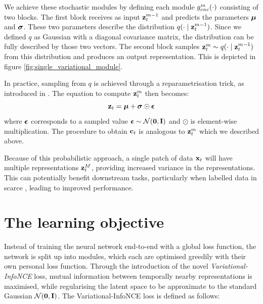 			We achieve these stochastic modules by defining each module $g_{enc}^m(\cdot)$ consisting of two blocks. The first block receives as input $\mathbf{z}_t^{m-1}$ and predicts the parameters $\bm{\mu}$ and $\bm{\sigma}$. These two parameters describe the distribution $q(\cdot \mid \mathbf{z}_t^{m-1})$. Since we defined $q$ as Gaussian with a diagonal covariance matrix, the distribution can be fully described by those two vectors. The second block samples 
			$\mathbf{z}_t^m \sim q(\cdot \mid \mathbf{z}_t^{m-1})$ from this distribution and produces an output representation. This is depicted in figure \ref{fig:single_variational_module}.
			
			
			
			In practice, sampling from $q$ is achieved through a reparametrisation trick, as introduced in \cite{kingmaAutoEncodingVariationalBayes2022}. The equation to compute $\mathbf{z}_t^m$ then becomes:
			\begin{equation*}
				\mathbf{z}_t = \bm{\mu} + \bm{\sigma} \odot \bm{\epsilon}
			\end{equation*}
			where $\bm{\epsilon}$ corresponds to a sampled value $\bm{\epsilon} \sim \mathcal{N}(\bm{\mathbf{0}}, \mathbf{I})$ and $\odot$ is element-wise multiplication. The procedure to obtain $\mathbf{c}_t$ is analogous to $\mathbf{z}_t^m$ which we described above.
			
			
		Because of this probabilistic approach, a single patch of data $\mathbf{x}_t$ will have multiple representations $\mathbf{z}_t^M$, providing increased variance in the representations. This can potentially benefit downstream tasks, particularly when labelled data in scarce \cite{weiRecentAdvancesVariational2021}, leading to improved performance. %
			

		
		
\section{The learning objective}
	Instead of training the neural network end-to-end with a global loss function, the network is split up into modules, which each are optimised greedily with their own personal loss function. Through the introduction of the novel \textit{Variational-InfoNCE} loss, mutual information between temporally nearby representations is maximised, while regularising the latent space to be approximate to the standard Gaussian $\mathcal{N}(\bm{\mathbf{0}}, \mathbf{I})$. The Variational-InfoNCE loss is defined as follows:
	
